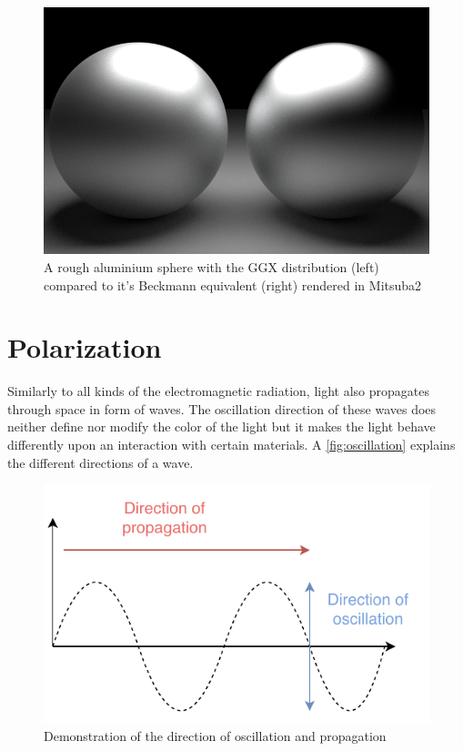 \begin{figure}[h]
	\centering
	\includegraphics[width=.8\linewidth]{img/ggx_beckmann.png}
	\caption{A rough aluminium sphere with the GGX distribution (left) compared to it's Beckmann equivalent (right) rendered  in Mitsuba2}
	\label{fig:ggx_beckmann}
\end{figure}

\section{Polarization}
\label{sec:polarization}

Similarly to all kinds of the electromagnetic radiation, light also propagates through space in form of waves. The oscillation direction of these waves does neither define nor modify the color of the light but it makes the light behave differently upon an interaction with certain materials. A \autoref{fig:oscillation} explains the different directions of a wave.

\begin{figure}[h]
	\centering
	\includegraphics[width=.8\linewidth]{img/oscillation.pdf}
	\caption{Demonstration of the direction of oscillation and propagation}
	\label{fig:oscillation}
\end{figure}

